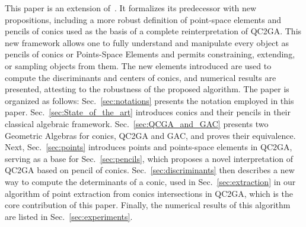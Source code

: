\documentclass{birkjour}
\begin{document}
This paper is an extension of~\cite{chomicki_intersection_2023}.
It formalizes its predecessor with new propositions, including a more robust definition of point-space elements and pencils of conics used as the basis of a complete reinterpretation of QC2GA. 
This new framework allows one to fully understand and manipulate every object as pencils of conics or Points-Space Elements and permits constraining, extending, or sampling objects from them.
The new elements introduced are used to compute the discriminants and centers of conics, and numerical results are presented, attesting to the robustness of the proposed algorithm. The paper is organized as follows: Sec.~\ref{sec:notations} presents the notation employed in this paper. Sec.~\ref{sec:State_of_the_art} introduces conics and their pencils in their classical algebraic framework. Sec.~\ref{sec:QCGA_and_GAC} presents two Geometric Algebras for conics, QC2GA and GAC, and proves their equivalence. Next, Sec.~\ref{sec:points} introduces points and points-space elements in QC2GA, serving as a base for Sec.~\ref{sec:pencils}, which proposes a novel interpretation of QC2GA based on pencil of conics. Sec.~\ref{sec:discriminants} then describes a new way to compute the determinants of a conic, used in Sec.~\ref{sec:extraction} in our algorithm of point extraction from conics intersections in QC2GA, which is the core contribution of this paper. Finally, the numerical results of this algorithm are listed in Sec.~\ref{sec:experiments}.
\end{document}
